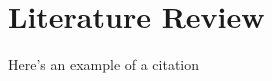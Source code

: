 \documentclass[../Main_PhD_Dissertation.tex]{subfiles}
\begin{document}
	
	\chapter{Literature Review}
	\label{chap:LitReview}
	
Here's an example of a citation \cite{Miller2007} 
	
	
\end{document}
